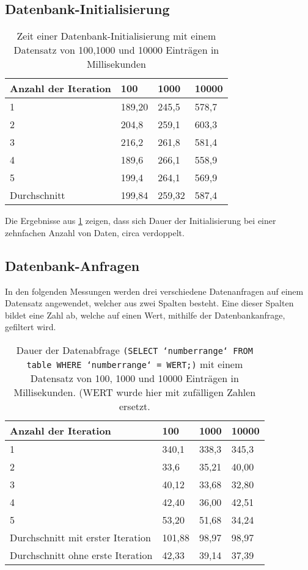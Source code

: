 \subsection{Datenbank-Initialisierung}
\begin{table}[H]
\begin{center}
    \begin{tabular}{| l | l | l | l |}
    \hline
    Anzahl der Iteration & 100 & 1000 & 10000 \\ \hline
    1& 189,20 & 245,5  & 578,7 \\ \hline
    2& 204,8 & 259,1 & 603,3 \\ \hline
    3& 216,2& 261,8 & 581,4 \\ \hline
    4& 189,6 & 266,1 & 558,9 \\ \hline
    5& 199,4 & 264,1 & 569,9 \\ \hline
	Durchschnitt & 199,84 & 259,32 & 587,4\\ \hline
    \end{tabular}
\end{center}
\caption{Zeit einer Datenbank-Initialisierung mit einem Datensatz von 100,1000 und 10000 Einträgen in Millisekunden}
\label{tabelle_avarage_time}
\end{table}

Die Ergebnisse aus \ref{tabelle_avarage_time} zeigen, dass sich Dauer der Initialisierung bei einer zehnfachen Anzahl von Daten, circa verdoppelt.

\subsection{Datenbank-Anfragen}

In den folgenden Messungen werden drei verschiedene Datenanfragen auf einem Datensatz angewendet, welcher aus zwei Spalten besteht. Eine dieser Spalten bildet eine Zahl ab, welche auf einen Wert, mithilfe der Datenbankanfrage, gefiltert wird.

\begin{table}[H]
\begin{center}
    \begin{tabular}{| l | l | l | l |}
    \hline
    Anzahl der Iteration & 100 & 1000 & 10000 \\ \hline
    1& 340,1 & 338,3  & 345,3 \\ \hline
    2& 33,6 & 35,21 & 40,00\\ \hline
    3& 40,12& 33,68 & 32,80 \\ \hline
    4& 42,40 & 36,00 & 42,51 \\ \hline
    5& 53,20 & 51,68 & 34,24 \\ \hline
	Durchschnitt mit erster Iteration & 101,88 & 98,97 & 98,97\\ \hline
	Durchschnitt ohne erste Iteration & 42,33 & 39,14 & 37,39\\ \hline
    \end{tabular}
\end{center}
\caption{Dauer der Datenabfrage \texttt{(SELECT `numberrange` FROM table WHERE `numberrange` = WERT;)} mit einem Datensatz von 100, 1000 und 10000 Einträgen in Millisekunden. (WERT wurde hier mit zufälligen Zahlen ersetzt.}
\label{equalTabelle}
\end{table}

